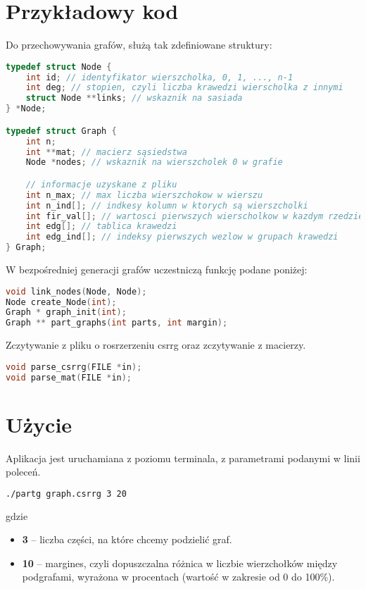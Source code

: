 \documentclass[a4paper,12pt]{article}
\begin{document}
\section{Przykładowy kod}
Do przechowywania grafów, służą tak zdefiniowane struktury:
\begin{lstlisting}[language=C, caption=struktura grafu]
typedef struct Node {
    int id; // identyfikator wierszcholka, 0, 1, ..., n-1
    int deg; // stopien, czyli liczba krawedzi wierscholka z innymi
    struct Node **links; // wskaznik na sasiada
} *Node;

typedef struct Graph {
    int n; 
    int **mat; // macierz sąsiedstwa
    Node *nodes; // wskaznik na wierszcholek 0 w grafie

    // informacje uzyskane z pliku
    int n_max; // max liczba wierszchokow w wierszu
    int n_ind[]; // indkesy kolumn w ktorych są wierszcholki
    int fir_val[]; // wartosci pierwszych wierscholkow w kazdym rzedzie
    int edg[]; // tablica krawedzi 
    int edg_ind[]; // indeksy pierwszych wezlow w grupach krawedzi
} Graph;
\end{lstlisting}
W bezpośredniej generacji grafów uczestniczą funkcję podane poniżej:
\begin{lstlisting}[language=C, caption=generacja]
void link_nodes(Node, Node);
Node create_Node(int);
Graph * graph_init(int);
Graph ** part_graphs(int parts, int margin);
\end{lstlisting}
Zczytywanie z pliku o rosrzerzeniu csrrg oraz zczytywanie z macierzy.
\begin{lstlisting}[language=C, caption=parsowanie i konwertowanie]
void parse_csrrg(FILE *in);
void parse_mat(FILE *in);
\end{lstlisting}

\section{Użycie}
Aplikacja jest uruchamiana z poziomu terminala, z parametrami podanymi w linii poleceń.
\begin{lstlisting}[language=bash, caption= Przykład uruchomienia programu w terminalu]
./partg graph.csrrg 3 20
\end{lstlisting}
gdzie 
\begin{itemize}
    \item \textbf{3} – liczba części, na które chcemy podzielić graf.
    \item \textbf{10} – margines, czyli dopuszczalna różnica w liczbie wierzchołków między podgrafami, wyrażona w procentach (wartość w zakresie od 0 do 100\%).
\end{itemize}
\end{document}
